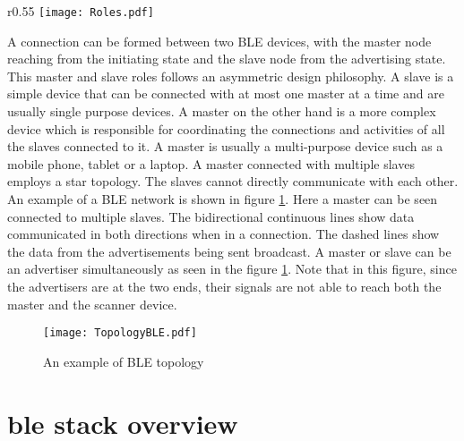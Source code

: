 \begin{wrapfigure}{r}{0.55\textwidth}
\centering
\texttt{[image: Roles.pdf]}
\caption{State diagram of BLE states}
\label{fig:Roles}
\vspace{-10pt}
\end{wrapfigure}

A connection can be formed between two BLE devices, with the master node reaching from the initiating state and the slave node from the advertising state. This master and slave roles follows an asymmetric design philosophy. A slave is a simple device that can be connected with at most one master at a time and are usually single purpose devices. A master on the other hand is a more complex device which is responsible for coordinating the connections and activities of all the slaves connected to it. A master is usually a multi-purpose device such as a mobile phone, tablet or a laptop. A master connected with multiple slaves employs a star topology. The slaves cannot directly communicate with each other. An example of a BLE network is shown in figure \ref{fig:TopoBLE}. Here a master can be seen connected to multiple slaves. The bidirectional continuous lines show data communicated in both directions when in a connection. The dashed lines show the data from the advertisements being sent broadcast. A master or slave can be an advertiser simultaneously as seen in the figure \ref{fig:TopoBLE}. Note that in this figure, since the advertisers are at the two ends, their signals are not able to reach both the master and the scanner device.

\begin{figure}[h]
\centering
\texttt{[image: TopologyBLE.pdf]}
\caption{An example of BLE topology}
\label{fig:TopoBLE}
\end{figure}


\section[\texorpdfstring{\gls{ble}}{BLE} Stack Overview]{\texorpdfstring{\gls{ble}}{BLE} stack overview\cite{Heydon2012}}

